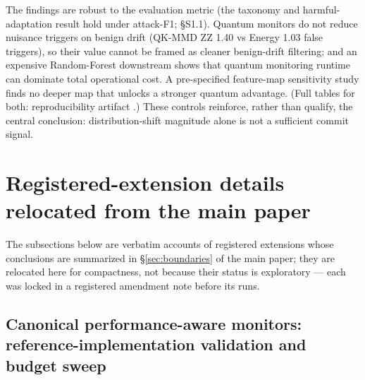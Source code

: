 \documentclass[a4paper,11pt]{article}
\makeatletter
\let\supp@subsection\subsection
\renewcommand{\subsection}{\FloatBarrier\supp@subsection}
\makeatother
\begin{document}
The findings are robust to the evaluation metric (the taxonomy and harmful-adaptation result hold under attack-F1; \S S1.1). Quantum monitors do not reduce nuisance triggers on benign drift (QK-MMD ZZ 1.40 vs Energy 1.03 false triggers), so their value cannot be framed as cleaner benign-drift filtering; and an expensive Random-Forest downstream shows that quantum monitoring runtime can dominate total operational cost. A pre-specified feature-map sensitivity study finds no deeper map that unlocks a stronger quantum advantage. (Full tables for both: reproducibility artifact \cite{fernandezbarrios2026artifact}.) These controls reinforce, rather than qualify, the central conclusion: distribution-shift magnitude alone is not a sufficient commit signal.




\section{Registered-extension details relocated from the main paper}
The subsections below are verbatim accounts of registered extensions whose conclusions are summarized in \S\ref{sec:boundaries} of the main paper; they are relocated here for compactness, not because their status is exploratory --- each was locked in a registered amendment note before its runs.

\subsection{Canonical performance-aware monitors: reference-implementation validation and budget sweep}
\end{document}
